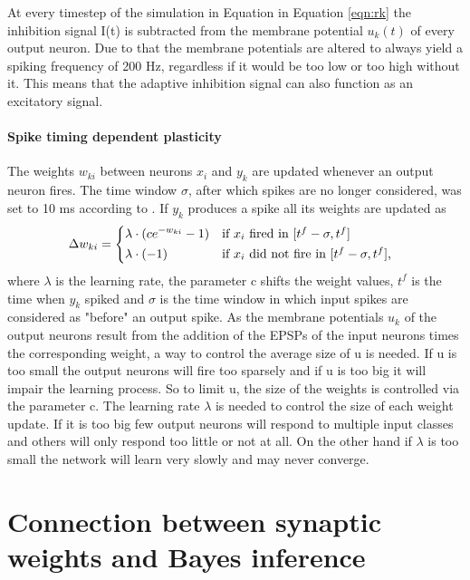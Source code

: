 At every timestep of the simulation in Equation in Equation \ref{eqn:rk} the inhibition signal I(t) is subtracted from the membrane potential $u_k(t)$ of every output neuron. Due to that the membrane potentials are altered to always yield a spiking frequency of 200 Hz, regardless if it would be too low or too high without it. This means that the adaptive inhibition signal can also function as an excitatory signal. 

\paragraph{Spike timing dependent plasticity}
The weights $w_{ki}$ between neurons $x_i$ and $y_k$ are updated whenever an output neuron fires. The time window $\sigma$, after which spikes are no longer considered, was set to 10 ms according to \citet{nessler}. If $y_k$ produces a spike all its weights are updated as
\begin{equation}
\label{deltawki}
\Delta w_{ki} = \begin{dcases*} \lambda \cdot (ce^{-w_{ki}} - 1) & if $x_{i}$ fired in $ [t^f - \sigma, t^f] $ \\
\lambda \cdot (-1) & \text{if $ x_i $ did not fire in $ [t^f - \sigma, t^f] $, } \end{dcases*}
\end{equation}
where $\lambda$ is the learning rate, the parameter c shifts the weight values, $t^f$ is the time when $y_k$ spiked and $\sigma$ is the time window in which input spikes are considered as "before" an output spike. As the membrane potentials $u_k$ of the output neurons result from the addition of the EPSPs of the input neurons times the corresponding weight, a way to control the average size of u is needed. If u is too small the output neurons will fire too sparsely and if u is too big it will impair the learning process. So to limit u, the size of the weights is controlled via the parameter c. The learning rate $\lambda$ is needed to control the size of each weight update. If it is too big few output neurons will respond to multiple input classes and others will only respond too little or not at all. On the other hand if $\lambda$ is too small the network will learn very slowly and may never converge. 

\section{Connection between synaptic weights and Bayes inference}

